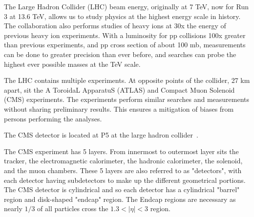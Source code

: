 The Large Hadron Collider (LHC) beam energy, originally at 7 TeV, now for Run 3 at 13.6 TeV, allows us to study physics at the highest energy scale in history. The collaboration also performs studies of heavy ions at 30x the energy of previous heavy ion experiments. With a luminosity for pp collisions 100x greater than previous experiments, and pp cross section of about 100 mb, measurements can be done to greater precision than ever before, and searches can probe the highest ever possible masses at the TeV scale.

The LHC contains multiple experiments. At opposite points of the collider, 27 km apart, sit the A ToroidaL ApparatuS (ATLAS) and Compact Muon Solenoid (CMS) experiments. The experiments perform similar searches and measurements without sharing preliminary results. This ensures a mitigation of biases from persons performing the analyses.

The CMS detector is located at P5 at the large hadron collider~\cite{CMSExperiment}.


The CMS experiment has 5 layers. From innermost to outermost layer sits the tracker, the electromagnetic calorimeter, the hadronic calorimeter, the solenoid, and the muon chambers. These 5 layers are also referred to as "detectors", with each detector having subdetectors to make up the different geometrical portions. The CMS detector is cylindrical and so each detector has a cylindrical "barrel" region and disk-shaped "endcap" region. The Endcap regions are necessary as nearly $1/3$ of all particles cross the $1.3 < |\eta| < 3$ region.
